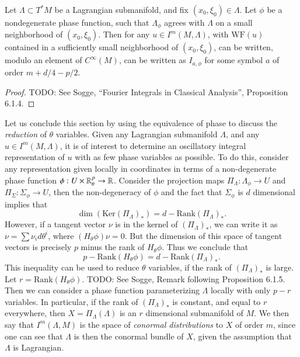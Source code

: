\begin{theorem}
    Let $\Lambda \subset T^*M$ be a Lagrangian submanifold, and fix $(x_0,\xi_0) \in \Lambda$. Let $\phi$ be a nondegenerate phase function, such that $\Lambda_\phi$ agrees with $\Lambda$ on a small neighborhood of $(x_0,\xi_0)$. Then for any $u \in I^m(M, \Lambda)$, with $\text{WF}(u)$ contained in a sufficiently small neighborhood of $(x_0,\xi_0)$, can be written, modulo an element of $C^\infty(M)$, can be written as $I_{a,\phi}$ for some symbol $a$ of order $m + d/4 - p/2$.
\end{theorem}
\begin{proof}
    TODO: See Sogge, ``Fourier Integrals in Classical Analysis'', Proposition 6.1.4.
\end{proof}

Let us conclude this section by using the equivalence of phase to discuss the \emph{reduction} of $\theta$ variables. Given any Lagrangian submanifold $\Lambda$, and any $u \in I^m(M, \Lambda)$, it is of interest to determine an oscillatory integral representation of $u$ with as few phase variables as possible. To do this, consider any representation given locally in coordinates in terms of a non-degenerate phase function $\phi: U \times \operatorname{\mathbb{R}}^p_\theta \to \operatorname{\mathbb{R}}$. Consider the projection maps $\Pi_\Lambda: \Lambda_\phi \to U$ and $\Pi_\Sigma: \Sigma_\phi \to U$, then the non-degeneracy of $\phi$ and the fact that $\Sigma_\phi$ is $d$ dimensional implies that
%
\[ \dim ( \text{Ker} (\Pi_\Lambda)_* ) = d - \text{Rank} (\Pi_\Lambda)_*. \]
%
However, if a tangent vector $\nu$ is in the kernel of $(\Pi_\Lambda)_*$, we can write it as $\nu = \sum \nu_i d\theta^i$, where $(H_\theta \phi) \nu = 0$. But the dimension of this space of tangent vectors is precisely $p$ minus the rank of $H_\theta \phi$. Thus we conclude that
%
\[ p - \text{Rank}(H_\theta \phi) = d - \text{Rank} (\Pi_\Lambda)_*. \]
%
This inequality can be used to reduce $\theta$ variables, if the rank of $(\Pi_\Lambda)_*$ is large. Let $r = \text{Rank}(H_\theta \phi)$. TODO: See Sogge, Remark following Proposition 6.1.5. Then we can consider a phase function parameterizing $\Lambda$ locally with only $p - r$ variables. In particular, if the rank of $(\Pi_\Lambda)_*$ is constant, and equal to $r$ everywhere, then $X = \Pi_\Lambda(\Lambda)$ is an $r$ dimensional submanifold of $M$. We then say that $I^m(\Lambda,M)$ is the space of \emph{conormal distributions} to $X$ of order $m$, since one can see that $\Lambda$ is then the conormal bundle of $X$, given the assumption that $\Lambda$ is Lagrangian.

